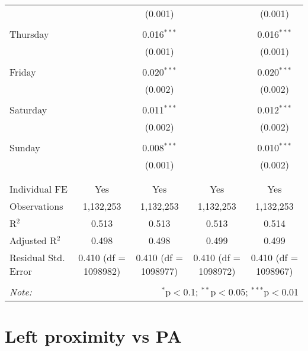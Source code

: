 \documentclass[
]{article}
\begin{document}
\begin{table}[!htbp]
{\begin{tabular}{@{\extracolsep{5pt}}lcccc}
  &  & (0.001) &  & (0.001) \\ 
  & & & & \\ 
 Thursday &  & 0.016$^{***}$ &  & 0.016$^{***}$ \\ 
  &  & (0.001) &  & (0.001) \\ 
  & & & & \\ 
 Friday &  & 0.020$^{***}$ &  & 0.020$^{***}$ \\ 
  &  & (0.002) &  & (0.002) \\ 
  & & & & \\ 
 Saturday &  & 0.011$^{***}$ &  & 0.012$^{***}$ \\ 
  &  & (0.002) &  & (0.002) \\ 
  & & & & \\ 
 Sunday &  & 0.008$^{***}$ &  & 0.010$^{***}$ \\ 
  &  & (0.001) &  & (0.002) \\ 
  & & & & \\ 
\hline \\[-1.8ex] 
Individual FE & Yes & Yes & Yes & Yes \\ 
Observations & 1,132,253 & 1,132,253 & 1,132,253 & 1,132,253 \\ 
R$^{2}$ & 0.513 & 0.513 & 0.513 & 0.514 \\ 
Adjusted R$^{2}$ & 0.498 & 0.498 & 0.499 & 0.499 \\ 
Residual Std. Error & 0.410 (df = 1098982) & 0.410 (df = 1098977) & 0.410 (df = 1098972) & 0.410 (df = 1098967) \\ 
\hline 
\hline \\[-1.8ex] 
\textit{Note:}  & \multicolumn{4}{r}{$^{*}$p$<$0.1; $^{**}$p$<$0.05; $^{***}$p$<$0.01} \\ 
\end{tabular}
} 
\end{table} 
\newpage
\section{Left proximity vs PA}
\end{document}
